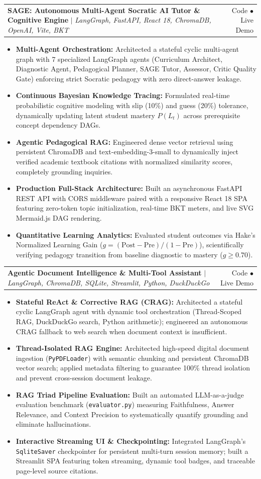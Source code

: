 \documentclass[letterpaper,10pt]{article}
\makeatletter
\newcommand{\resumeItem}[1]{
  \item\small{
    {#1 \vspace{-2pt}}
  }
}
\newcommand{\resumeProjectHeading}[2]{
    \item
    \begin{tabular*}{0.97\textwidth}{l@{\extracolsep{\fill}}r}
      \small#1 & #2 \\
    \end{tabular*}\vspace{-7pt}
}
\newcommand{\resumeItemListStart}{\begin{itemize}}
\newcommand{\resumeItemListEnd}{\end{itemize}\vspace{-5pt}}
\makeatother
\begin{document}
      \resumeProjectHeading
          {\textbf{SAGE: Autonomous Multi-Agent Socratic AI Tutor \& Cognitive Engine} $\mid$ \emph{LangGraph, FastAPI, React 18, ChromaDB, OpenAI, Vite, BKT}}{Code $\bullet$ Live Demo}
          \resumeItemListStart
            \resumeItem{\textbf{Multi-Agent Orchestration:} Architected a stateful cyclic multi-agent graph with 7 specialized LangGraph agents (Curriculum Architect, Diagnostic Agent, Pedagogical Planner, SAGE Tutor, Assessor, Critic Quality Gate) enforcing strict Socratic pedagogy with zero direct-answer leakage.}
            \resumeItem{\textbf{Continuous Bayesian Knowledge Tracing:} Formulated real-time probabilistic cognitive modeling with slip (10\%) and guess (20\%) tolerance, dynamically updating latent student mastery $P(L_t)$ across prerequisite concept dependency DAGs.}
            \resumeItem{\textbf{Agentic Pedagogical RAG:} Engineered dense vector retrieval using persistent ChromaDB and text-embedding-3-small to dynamically inject verified academic textbook citations with normalized similarity scores, completely grounding inquiries.}
            \resumeItem{\textbf{Production Full-Stack Architecture:} Built an asynchronous FastAPI REST API with CORS middleware paired with a responsive React 18 SPA featuring zero-token topic initialization, real-time BKT meters, and live SVG Mermaid.js DAG rendering.}
            \resumeItem{\textbf{Quantitative Learning Analytics:} Evaluated student outcomes via Hake's Normalized Learning Gain ($g = (\text{Post} - \text{Pre}) / (1 - \text{Pre})$), scientifically verifying pedagogy transition from baseline diagnostic to mastery ($g \ge 0.70$).}
          \resumeItemListEnd

      \resumeProjectHeading
          {\textbf{Agentic Document Intelligence \& Multi-Tool Assistant} $\mid$ \emph{LangGraph, ChromaDB, SQLite, Streamlit, Python, DuckDuckGo}}{Code $\bullet$ Live Demo}
          \resumeItemListStart
            \resumeItem{\textbf{Stateful ReAct \& Corrective RAG (CRAG):} Architected a stateful cyclic LangGraph agent with dynamic tool orchestration (Thread-Scoped RAG, DuckDuckGo search, Python arithmetic); engineered an autonomous CRAG fallback to web search when document context is insufficient.}
            \resumeItem{\textbf{Thread-Isolated RAG Engine:} Architected high-speed digital document ingestion (\texttt{PyPDFLoader}) with semantic chunking and persistent ChromaDB vector search; applied metadata filtering to guarantee 100\% thread isolation and prevent cross-session document leakage.}
            \resumeItem{\textbf{RAG Triad Pipeline Evaluation:} Built an automated LLM-as-a-judge evaluation benchmark (\texttt{evaluator.py}) measuring Faithfulness, Answer Relevance, and Context Precision to systematically quantify grounding and eliminate hallucinations.}
            \resumeItem{\textbf{Interactive Streaming UI \& Checkpointing:} Integrated LangGraph's \texttt{SqliteSaver} checkpointer for persistent multi-turn session memory; built a Streamlit SPA featuring token streaming, dynamic tool badges, and traceable page-level source citations.}
          \resumeItemListEnd
\end{document}
